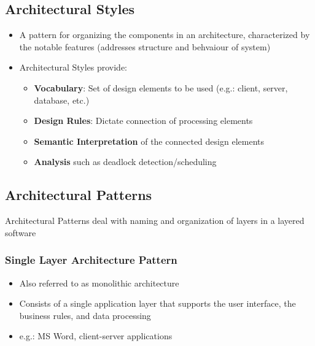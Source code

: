 \documentclass{article}
\begin{document}
\subsection{Architectural Styles}
\begin{itemize}
    \item A pattern for organizing the components in an architecture, characterized by the notable features (addresses structure and behvaiour of system)
    
    \item Architectural Styles provide:
    \begin{itemize}
        \item \textbf{Vocabulary}: Set of design elements to be used (e.g.: client, server, database, etc.)
        
        \item \textbf{Design Rules}: Dictate connection of processing elements
        
        \item \textbf{Semantic Interpretation} of the connected design elements
        
        \item \textbf{Analysis} such as deadlock detection/scheduling
    \end{itemize}
\end{itemize}



\subsection{Architectural Patterns}
Architectural Patterns deal with naming and organization of layers in a layered software
\subsubsection{Single Layer Architecture Pattern}
\begin{itemize}

    \item Also referred to as monolithic architecture
    
    \item Consists of a single application layer that supports the user interface, the business rules, and data processing
    
    \item e.g.: MS Word, client-server applications
\end{itemize}
\end{document}
